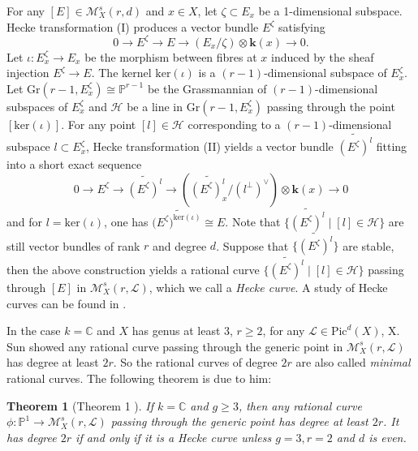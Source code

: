 \documentclass{kms-b}
\numberwithin{equation}{section}
\theoremstyle{plain}
\newtheorem{theorem}{Theorem}[section]
\theoremstyle{definition}
\theoremstyle{remark}
\begin{document}
For any $[E]\in\mathcal{M}^s_X(r,d)$ and $x \in X$, let $\zeta \subset E_x$ be a 1-dimensional subspace. Hecke transformation (I) produces a vector bundle $E^{\zeta}$ satisfying 
\begin{equation*}
    0 \to E^{\zeta} \to E \to (E_x/\zeta)\otimes \textbf{k}(x) \to 0.
\end{equation*}
Let $\iota: E_x^{\zeta}\to E_x$ be the morphism between fibres at $x$ induced by the sheaf injection $ E^{\zeta}\to E$. The kernel $\mathrm{ker}(\iota)$ is a $(r-1)$-dimensional subspace of $E_x^{\zeta}$. Let $\mathrm{Gr}(r-1,E_x^\zeta)\cong \mathbb{P}^{r-1}$ be the Grassmannian of $(r-1)$-dimensional subspaces of $E_x^\zeta$ and $\mathcal{H}$ be a line in $\mathrm{Gr}(r-1,E_x^\zeta)$ passing through the point $[\mathrm{ker}(\iota)]$. For any point $[l]\in \mathcal{H}$ corresponding to a $(r-1)$-dimensional subspace $l \subset E_x^{\zeta}$, Hecke transformation (II) yields a vector bundle $\widetilde{(E^{\zeta})^{l}}$ fitting into a short exact sequence
\begin{equation*}
    0 \to E^{\zeta} \to \widetilde{(E^{\zeta})^{l}} \to (\widetilde{(E^{\zeta})^{l}_x}/(l^{\bot})^{\vee})\otimes \textbf{k}(x) \to 0
\end{equation*}
and for $l = \mathrm{ker}(\iota)$, one has $(\widetilde{E^{\zeta})^{\mathrm{ker}(\iota)}} \cong E$. Note that $\{\widetilde{(E^{\zeta})^{l}} \mid [l] \in \mathcal{H} \}$ are still vector bundles of rank $r$ and degree $d$. Suppose that $\{\widetilde{(E^{\zeta})^{l}}\}$ are stable, then the above construction yields a rational curve $\{ \widetilde{(E^{\zeta})^{l}}\mid [l]\in \mathcal{H} \}$ passing through $[E]$ in $\mathcal{M}^s_X(r,\mathcal{L})$, which we call a \emph{Hecke curve}. A study of Hecke curves can be found in \cite{Hwang02}.

In the case $k=\mathbb{C}$ and $X$ has genus at least 3, $r\geqslant 2$, for any $\mathcal{L}\in \mathrm{Pic}^d(X)$, X. Sun \cite{Sun05} showed any rational curve passing through the generic point in $\mathcal{M}^s_X(r,\mathcal{L})$ has degree at least $2r$. So the rational curves of degree $2r$ are also called \emph{minimal} rational curves. The following theorem is due to him:

\begin{theorem}[Theorem 1 \cite{Sun05}]
If $k=\mathbb{C}$ and $g \geq 3$, then any rational curve $\phi: \mathbb{P}^1 \to \mathcal{M}^s_X(r,\mathcal{L})$ passing through the generic point has degree at least $2r$. It has degree $2r$ if and only if it is a Hecke curve unless $g=3, r=2$ and $d$ is even.
\end{theorem}
\end{document}
